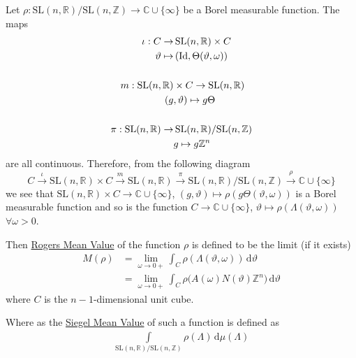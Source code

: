 \documentclass[11pt]{article}
\theoremstyle{definition}
\theoremstyle{proof}
\begin{document}
Let $\rho : \mathrm{SL}(n,\mathbb{R})/\mathrm{SL}(n,\mathbb{Z}) \to \mathbb{C} \cup \{\infty\}$ be a Borel measurable function.
The maps
\begin{align*}
    \iota : C \to & \, \mathrm{SL}(n,\mathbb{R}) \times C \\
    \vartheta \mapsto & \, (\mathrm{Id}, \Theta (\vartheta, \omega )) \\
    \newline \\
    m : \mathrm{SL}(n,\mathbb{R}) &\times C \to  \mathrm{SL}(n,\mathbb{R}) \\
    (g&, \vartheta ) \mapsto g \Theta \\
    \newline \\
    \pi : \mathrm{SL}(n,\mathbb{R}) \to & \, \mathrm{SL}(n,\mathbb{R})/\mathrm{SL}(n,\mathbb{Z}) \\
    &g \mapsto g\mathbb{Z}^{n}
\end{align*}
are all continuous.
Therefore, from the following diagram
\[
    C \xrightarrow{\iota } \mathrm{SL}(n,\mathbb{R}) \times C \xrightarrow{m} \mathrm{SL}(n,\mathbb{R}) \xrightarrow{ \pi } \mathrm{SL}(n,\mathbb{R})/\mathrm{SL}(n,\mathbb{Z}) \xrightarrow{\rho } \mathbb{C} \cup \{\infty\}
\]
we see that $\mathrm{SL}(n,\mathbb{R}) \times C \to \mathbb{C} \cup \{\infty\}$, $(g,\vartheta ) \mapsto \rho (g \Theta (\vartheta , \omega ))$ is a Borel measurable function and so is the function $C \to \mathbb{C} \cup \{\infty\}$, $\vartheta \mapsto \rho (\Lambda (\vartheta , \omega ))$ $\forall \omega > 0$.

Then \uline{Rogers Mean Value} of the function $\rho$ is defined to be the limit (if it exists)
\begin{equation}\label{rmv}
    \begin{split}
        M(\rho ) &= \lim_{\omega \to 0+} \int_{C} \rho (\Lambda (\vartheta , \omega )) \, \mathrm{d} \vartheta \\
        &= \lim_{\omega \to 0+} \int_{C} \rho \big(A(\omega ) N(\vartheta ) \mathbb{Z}^{n}\big) \, \mathrm{d} \vartheta 
    \end{split}
\end{equation}
where $C$ is the $n-1$-dimensional unit cube.

Where as the \uline{Siegel Mean Value} of such a function is defined as
\begin{equation}\label{smv}
    \begin{split}
        \int\limits_{\mathrm{SL}(n,\mathbb{R})/\mathrm{SL}(n,\mathbb{Z})} \rho (\Lambda ) \, \mathrm{d} \mu (\Lambda )
    \end{split}
\end{equation}
\end{document}

